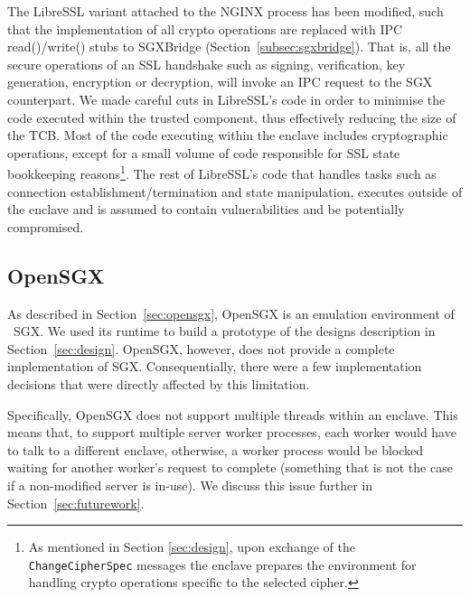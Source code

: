 \documentclass[../main.tex]{subfiles}
\begin{document}
The LibreSSL variant attached to the NGINX process has been modified, such that
the implementation of all crypto operations are replaced with IPC
read()/write() stubs to SGXBridge (Section~\ref{subsec:sgxbridge}). That is,
all the secure operations of an SSL handshake such as signing, verification,
key generation, encryption or decryption, will invoke an IPC request to the SGX
counterpart. We made careful cuts in LibreSSL's code in order to minimise the
code executed within the trusted component, thus effectively reducing the size
of the TCB. Most of the code executing within the enclave includes
cryptographic operations, except for a small volume of code responsible for
SSL state bookkeeping reasons\footnote{As mentioned in Section
\ref{sec:design}, upon exchange of the \texttt{ChangeCipherSpec} messages the
enclave prepares the environment for handling crypto operations specific to
the selected cipher.}. The rest of LibreSSL's code that handles tasks such as
connection establishment/termination and state manipulation, executes outside
of the enclave and is assumed to contain vulnerabilities and be potentially
compromised.

\subsection{OpenSGX}
\label{subsec:opensgx}
As described in Section~\ref{sec:opensgx}, OpenSGX is an emulation
environment of \Intel~SGX. We used its runtime to build a prototype of
the designs description in Section~\ref{sec:design}. OpenSGX, however,
does not provide a complete implementation of SGX. Consequentially,
there were a few implementation decisions that were directly affected
by this limitation.

Specifically, OpenSGX does not support multiple threads within an
enclave. This means that, to support multiple server worker processes,
each worker would have to talk to a different enclave, otherwise, a
worker process would be blocked waiting for another worker's request
to complete (something that is not the case if a non-modified server
is in-use). We discuss this issue further in
Section~\ref{sec:futurework}.
\end{document}
